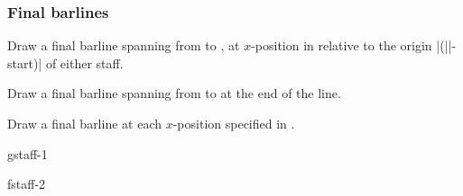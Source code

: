 \subsubsection{Final barlines}\label{sec:multistaff:barlines:final}
\begin{command}{\tmfinalbarline{}}
  Draw a final barline spanning from  to 
  , at $x$-position  in relative to 
  the origin |(||-start)| of either staff.
\end{command}
\begin{command}{\tmfinalbarlineendline{}}
  Draw a final barline spanning from  to 
   at the end of the line.
\end{command}
\begin{command}{\tmfinalbarlineinline{}}
  Draw a final barline at each $x$-position specified in .
\end{command}
\begin{codeexample}[]
\begin{tmline}%
\begin{tmstaff}{g}{staff-1}\end{tmstaff}%
\begin{tmstaff}{f}{staff-2}
\end{tmstaff}%
%
%
%
%
\end{tmline}
\end{codeexample}
